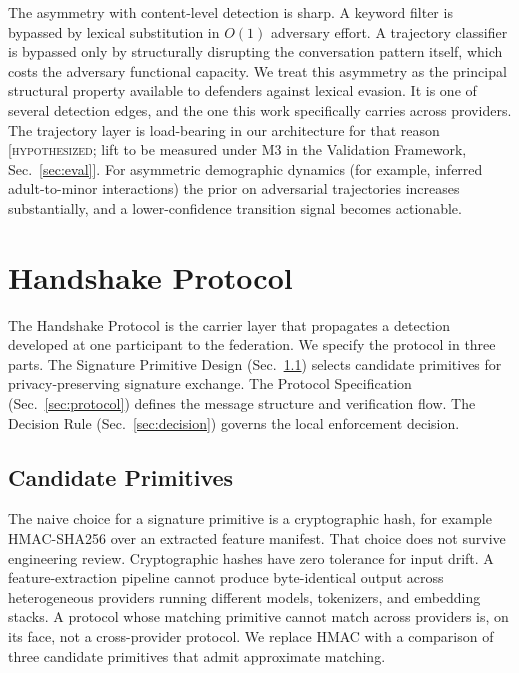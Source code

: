 \documentclass[11pt]{article}
\begin{document}
The asymmetry with content-level detection is sharp. A keyword filter is bypassed by lexical substitution in $O(1)$ adversary effort. A trajectory classifier is bypassed only by structurally disrupting the conversation pattern itself, which costs the adversary functional capacity. We treat this asymmetry as the principal structural property available to defenders against lexical evasion. It is one of several detection edges, and the one this work specifically carries across providers. The trajectory layer is load-bearing in our architecture for that reason [\textsc{hypothesized}; lift to be measured under M3 in the Validation Framework, Sec.~\ref{sec:eval}]. For asymmetric demographic dynamics (for example, inferred adult-to-minor interactions) the prior on adversarial trajectories increases substantially, and a lower-confidence transition signal becomes actionable.

\section{Handshake Protocol}
\label{sec:handshake}

The Handshake Protocol is the carrier layer that propagates a detection developed at one participant to the federation. We specify the protocol in three parts. The Signature Primitive Design (Sec.~\ref{sec:primitives}) selects candidate primitives for privacy-preserving signature exchange. The Protocol Specification (Sec.~\ref{sec:protocol}) defines the message structure and verification flow. The Decision Rule (Sec.~\ref{sec:decision}) governs the local enforcement decision.

\subsection{Candidate Primitives}
\label{sec:primitives}

The naive choice for a signature primitive is a cryptographic hash, for example HMAC-SHA256 over an extracted feature manifest. That choice does not survive engineering review. Cryptographic hashes have zero tolerance for input drift. A feature-extraction pipeline cannot produce byte-identical output across heterogeneous providers running different models, tokenizers, and embedding stacks. A protocol whose matching primitive cannot match across providers is, on its face, not a cross-provider protocol. We replace HMAC with a comparison of three candidate primitives that admit approximate matching.
\end{document}
